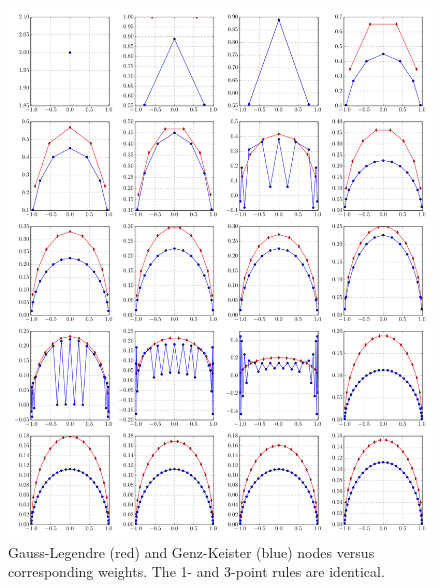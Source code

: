 \documentclass[a4paper,10pt]{article}
\begin{document}
\begin{figure}[h]
  \centering
  \includegraphics[width=\linewidth]{./img/gk_legendre_nodes_1d.pdf}
  \caption{Gauss-Legendre (red) and Genz-Keister (blue) nodes versus
  corresponding weights. The 1- and 3-point rules are identical.}
  \label{fig:gk_legendre_nodes_1d}
\end{figure}
\end{document}
